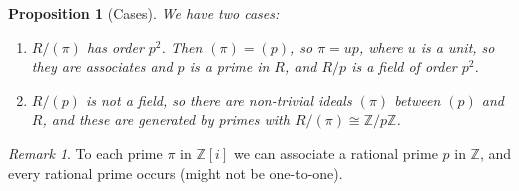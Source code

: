 \documentclass[12pt]{article}
\newtheorem{prop}[thm]{Proposition}
\theoremstyle{definition}
\theoremstyle{remark}
\newtheorem{rmk}[thm]{Remark}
\numberwithin{equation}{section}
\newcommand\Z{\mathbb Z}    %
\begin{document}
\vspace{15pt}

\begin{prop}[Cases]
        We have two cases: \begin{enumerate}
                \item $R/(\pi)$ has order $p^2$. Then $(\pi) = (p)$, so $\pi = up$, where $u$ is a unit, so they are associates and $p$ is a prime in $R$, and $R/p$ is a field of order $p^2$.
                \item $R/(p)$ is not a field, so there are non-trivial ideals $(\pi)$ between $(p)$ and $R$, and these are generated by primes with $R/(\pi) \cong \Z/p\Z$. 
        \end{enumerate}
\end{prop}


\vspace{15pt}

\begin{rmk}
        To each prime $\pi$ in $\Z[i]$ we can associate a rational prime $p$ in $\Z$, and every rational prime occurs (might not be one-to-one).
\end{rmk}

\vspace{15pt}
\end{document}
